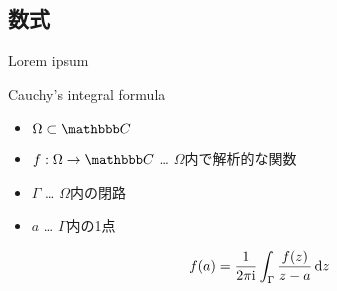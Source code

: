 \documentclass[12pt,unicode]{beamer}
\begin{document}
  \subsection{数式}
  \begin{frame}{Lorem ipsum}
    \begin{block}{Cauchy's integral formula}
      \begin{itemize}
        \item $\Omega\subset\bbC$
        \item $f:\Omega\to\bbC$ … $\Omega$内で解析的な関数
        \item $\Gamma$ … $\Omega$内の閉路
        \item $a$ … $\Gamma$内の1点
      \end{itemize}
      \begin{align}
        f(a) = \frac{1}{2\pi\mathrm{i}} \int_\Gamma \frac{f(z)}{z-a} \dd{z}
      \end{align}
    \end{block}
  \end{frame}
\end{document}
